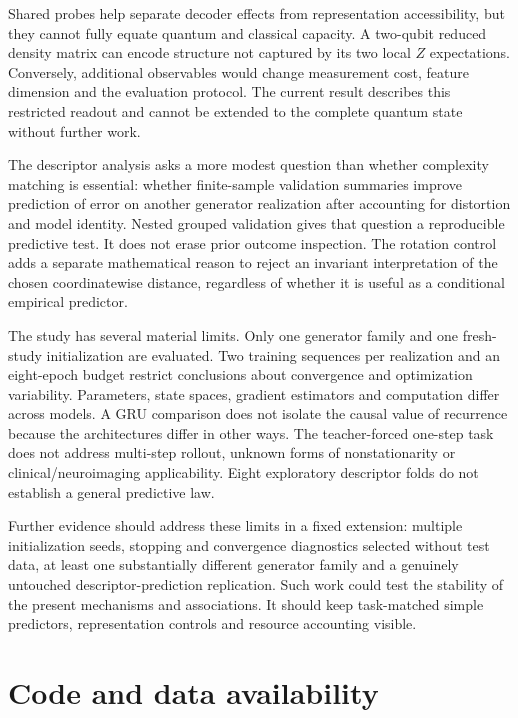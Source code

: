 \documentclass[
  11pt,
]{article}
\begin{document}
Shared probes help separate decoder effects from representation
accessibility, but they cannot fully equate quantum and classical
capacity. A two-qubit reduced density matrix can encode structure not
captured by its two local \(Z\) expectations. Conversely, additional
observables would change measurement cost, feature dimension and the
evaluation protocol. The current result describes this restricted
readout and cannot be extended to the complete quantum state without
further work.

The descriptor analysis asks a more modest question than whether
complexity matching is essential: whether finite-sample validation
summaries improve prediction of error on another generator realization
after accounting for distortion and model identity. Nested grouped
validation gives that question a reproducible predictive test. It does
not erase prior outcome inspection. The rotation control adds a separate
mathematical reason to reject an invariant interpretation of the chosen
coordinatewise distance, regardless of whether it is useful as a
conditional empirical predictor.

The study has several material limits. Only one generator family and one
fresh-study initialization are evaluated. Two training sequences per
realization and an eight-epoch budget restrict conclusions about
convergence and optimization variability. Parameters, state spaces,
gradient estimators and computation differ across models. A GRU
comparison does not isolate the causal value of recurrence because the
architectures differ in other ways. The teacher-forced one-step task
does not address multi-step rollout, unknown forms of nonstationarity or
clinical/neuroimaging applicability. Eight exploratory descriptor folds
do not establish a general predictive law.

Further evidence should address these limits in a fixed extension:
multiple initialization seeds, stopping and convergence diagnostics
selected without test data, at least one substantially different
generator family and a genuinely untouched descriptor-prediction
replication. Such work could test the stability of the present
mechanisms and associations. It should keep task-matched simple
predictors, representation controls and resource accounting visible.

\hypertarget{code-and-data-availability}{%
\section{Code and data availability}\label{code-and-data-availability}}
\end{document}
